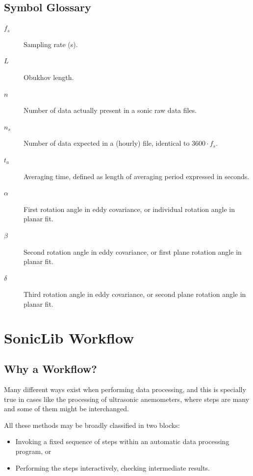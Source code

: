 \documentclass[a4paper,10pt]{book}
\begin{document}
\section{Symbol Glossary}
\label{sec:Glossary}

\begin{description}
 \item[$f_{s}$] Sampling rate (s).
 \item[$L$] Obukhov length.
 \item[$n$] Number of data actually present in a sonic raw data files.
 \item[$n_{s}$] Number of data expected in a (hourly) file, identical to $3600 \cdot f_{s}$.
 \item[$t_{a}$] Averaging time, defined as length of averaging period expressed in seconds.
 \item[$\alpha$] First rotation angle in eddy covariance, or individual rotation angle in planar fit.
 \item[$\beta$] Second rotation angle in eddy covariance, or first plane rotation angle in planar fit.
 \item[$\delta$] Third rotation angle in eddy covariance, or second plane rotation angle in planar fit.
\end{description}


\chapter{SonicLib Workflow}
\label{chap:Workflow}

\section{Why a Workflow?}
\label{sec:Workflow concept}

Many different ways exist when performing data processing, and this is specially true in cases like the processing of ultrasonic anemometers, where steps are many and some of them might be interchanged.

All these methods may be broadly classified in two blocks:

\begin{itemize}
 \item Invoking a fixed sequence of steps within an automatic data processing program, or
 \item Performing the steps interactively, checking intermediate results.
\end{itemize}
\end{document}

